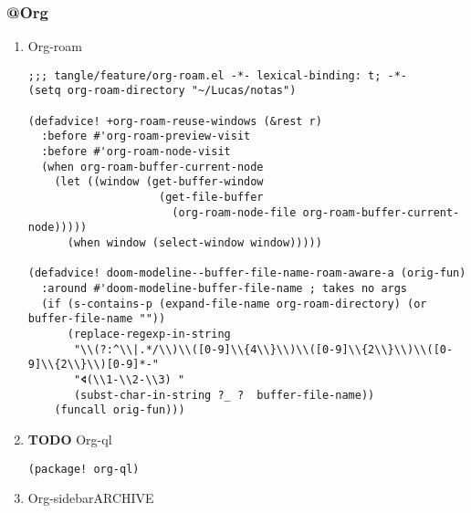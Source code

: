 \documentclass[11pt]{article}
\begin{document}
\subsubsection{@Org}
\label{sec:org7d93536}
\begin{enumerate}
\item Org-roam
\label{sec:org749418b}

\begin{verbatim}
;;; tangle/feature/org-roam.el -*- lexical-binding: t; -*-
(setq org-roam-directory "~/Lucas/notas")

(defadvice! +org-roam-reuse-windows (&rest r)
  :before #'org-roam-preview-visit
  :before #'org-roam-node-visit
  (when org-roam-buffer-current-node
    (let ((window (get-buffer-window
                    (get-file-buffer
                      (org-roam-node-file org-roam-buffer-current-node)))))
      (when window (select-window window)))))

(defadvice! doom-modeline--buffer-file-name-roam-aware-a (orig-fun)
  :around #'doom-modeline-buffer-file-name ; takes no args
  (if (s-contains-p (expand-file-name org-roam-directory) (or buffer-file-name ""))
      (replace-regexp-in-string
       "\\(?:^\\|.*/\\)\\([0-9]\\{4\\}\\)\\([0-9]\\{2\\}\\)\\([0-9]\\{2\\}\\)[0-9]*-"
       "🢔(\\1-\\2-\\3) "
       (subst-char-in-string ?_ ?  buffer-file-name))
    (funcall orig-fun)))
\end{verbatim}

\item {\bfseries\sffamily TODO} Org-ql
\label{sec:org362604f}
\begin{verbatim}
(package! org-ql)
\end{verbatim}

\item Org-sidebar\hfill{}\textsc{ARCHIVE}
\label{sec:org2cdedca}
\end{enumerate}
\end{document}
